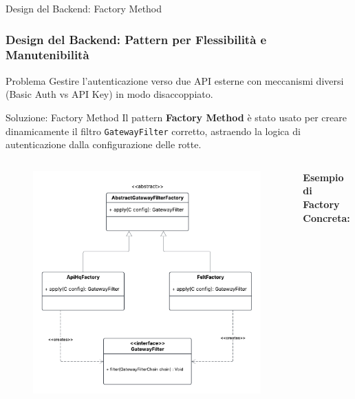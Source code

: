 \documentclass[8pt]{beamer}
\begin{document}
\begin{frame}[fragile]{Design del Backend: Factory Method}
  \frametitle{Design del Backend: Pattern per Flessibilità e Manutenibilità}
  \begin{alertblock}{Problema }
    Gestire l'autenticazione verso due API esterne con meccanismi diversi (Basic Auth vs API Key) in modo disaccoppiato.
  \end{alertblock}
  \begin{block}{Soluzione: Factory Method }
    Il pattern \textbf{Factory Method} è stato usato per creare dinamicamente il filtro \texttt{GatewayFilter} corretto, astraendo la logica di autenticazione dalla configurazione delle rotte.
  \end{block}
  \begin{columns}[T]
    \begin{figure}
      \includegraphics[width=\textwidth]{figures/gwfactory.pdf}
    \end{figure}
    \tiny \textbf{Esempio di Factory Concreta:}

  \end{columns}
\end{frame}
\end{document}
